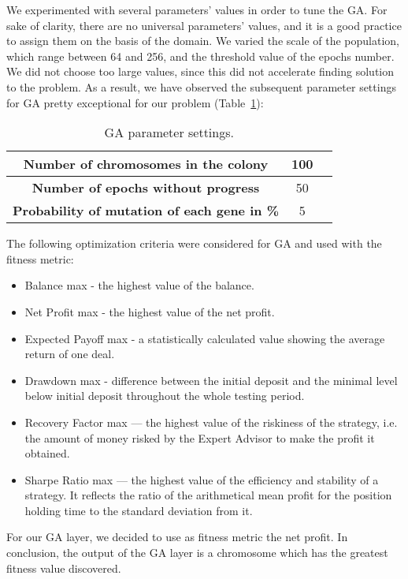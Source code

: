 We experimented with several parameters' values in order to tune the GA. For sake of clarity, there are no universal parameters' values, and it is a good practice to assign them on the basis of the domain. We varied the scale of the population, which range between 64 and 256, and the threshold value of the epochs number. We did not choose too large values, since this did not accelerate finding solution to the problem. 
As a result, we have observed the subsequent parameter settings for GA pretty exceptional for our problem (Table~\ref{tab:GAPS}):

\begin{table}[htb]
\centering
\begin{tabular}{|c|c|c|}
\hline 
\textbf{Number of chromosomes in the colony} & 100 \\ 
\hline 
\textbf{Number of epochs without progress} &  50\\ 
\hline 
\textbf{Probability of mutation of each gene in \%} &  5\\  
\hline 
\end{tabular} 
\caption{\label{tab:GAPS}GA parameter settings.}
\end{table}


The following optimization criteria were considered for GA and used with the fitness metric:
\begin{itemize}
\setlength\itemsep{0.3em}
\item Balance max - the highest value of the balance.
\item Net Profit max - the highest value of the net profit.
\item Expected Payoff max - a statistically calculated value showing the average return of one deal.
\item Drawdown max - difference between the initial deposit and the minimal level below initial deposit throughout the whole testing period.
\item Recovery Factor max — the highest value of the riskiness of the strategy, i.e. the amount of money risked by the Expert Advisor to make the profit it obtained.
\item Sharpe Ratio max — the highest value of the efficiency and stability of a strategy. It reflects the ratio of the arithmetical mean profit for the position holding time to the standard deviation from it.
\end{itemize}

For our GA layer, we decided to use as fitness metric the net profit.
In conclusion, the output of the GA layer is a chromosome which has the greatest fitness value discovered.

